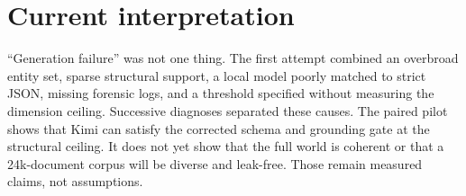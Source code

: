 \documentclass[11pt]{article}
\begin{document}
\section{Current interpretation}

``Generation failure'' was not one thing. The first attempt combined an
overbroad entity set, sparse structural support, a local model poorly matched to
strict JSON, missing forensic logs, and a threshold specified without measuring
the dimension ceiling. Successive diagnoses separated these causes. The paired
pilot shows that Kimi can satisfy the corrected schema and grounding gate at the
structural ceiling. It does not yet show that the full world is coherent or that
a 24k-document corpus will be diverse and leak-free. Those remain measured
claims, not assumptions.
\end{document}
